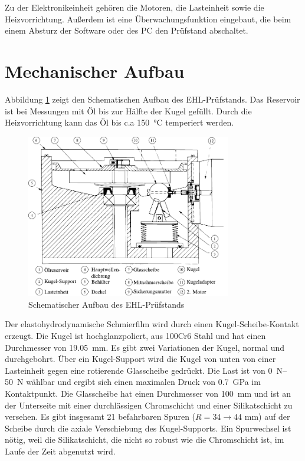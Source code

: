 Zu der Elektronikeinheit gehören die Motoren, die Lasteinheit sowie die Heizvorrichtung.
Außerdem ist eine Überwachungsfunktion eingebaut, die beim einem Absturz der Software oder des PC den Prüfstand abschaltet.

\section{Mechanischer Aufbau}
\label{sec:mechanischer_aufbau}

Abbildung \ref{fig:ehl_aufbau} zeigt den Schematischen Aufbau des EHL-Prüfstands.
Das Reservoir ist bei Messungen mit Öl bis zur Hälfte der Kugel gefüllt.
Durch die Heizvorrichtung kann das Öl bis c.a \SI{150}{\degreeCelsius} temperiert werden.
\begin{figure}[htb]
    \centering
    \includegraphics[width=0.8\textwidth]{./images/ehd_pruefstand_aufbau.pdf}
    \caption{Schematischer Aufbau des EHL-Prüfstands \cite{ehl}}
    \label{fig:ehl_aufbau}
\end{figure}
%
Der elastohydrodynamische Schmierfilm wird durch einen Kugel-Scheibe-Kontakt erzeugt.
Die Kugel ist hochglanzpoliert, aus 100Cr6 Stahl und hat einen Durchmesser von \SI{19.05}{\milli\meter}.
Es gibt zwei Variationen der Kugel, normal und durchgebohrt.
Über ein Kugel-Support wird die Kugel von unten von einer Lasteinheit gegen eine rotierende Glasscheibe gedrückt.
Die Last ist von \SIrange{0}{50}{\newton} wählbar und ergibt sich einen maximalen Druck von \SI{0.7}{\giga\pascal} im Kontaktpunkt.
Die Glasscheibe hat einen Durchmesser von \SI{100}{\milli\meter} und ist an der Unterseite mit einer durchlässigen Chromschicht und einer Silikatschicht zu versehen.
Es gibt insgesamt \num{21} befahrbaren Spuren ($R = 34 \rightarrow 44$ \si{\milli\meter}) auf der Scheibe durch die axiale Verschiebung des Kugel-Supports.
Ein Spurwechsel ist nötig, weil die Silikatschicht, die nicht so robust wie die Chromschicht ist, im Laufe der Zeit abgenutzt wird.

